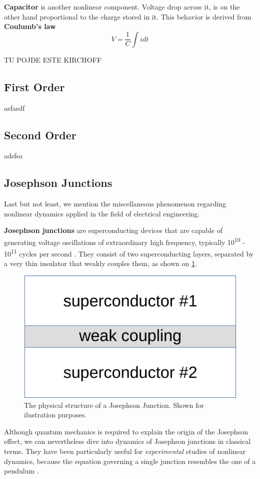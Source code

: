 \documentclass[journal]{IEEEtran}
\begin{document}
\textbf{Capacitor} is another nonlinear component. Voltage drop across it, is on the other hand proportional to the charge stored in it. This behavior is derived from  \textbf{Coulumb's law}
$$V=\frac{1}{C}\int idt$$

TU POJDE ESTE KIRCHOFF

\subsection{First Order}
asfasdf

\subsection{Second Order }
adsfsa


\subsection{Josephson Junctions}
Last but not least, we mention the miscellaneous phenomenon regarding nonlinear dynamics applied in the field of electrical engineering.

\textbf{Josephson junctions} are superconducting devices that are capable of generating voltage oscillations of extraordinary high frequency, typically 10\textsuperscript{10} - 10\textsuperscript{11} cycles per second \cite{van1981principles}. They consist of two superconducting layers, separated by a very thin insulator that weakly couples them, as shown on \cref{f:jjunc}.

\begin{figure}[ht!]
	\centering
	\includegraphics[width=.4\linewidth]{jjunc}
	\caption{The physical structure of a Josephson Junction. Shown for ilustration purposes.}
	\label{f:jjunc}
\end{figure}

Although quantum mechanics is required to explain the origin of the Josephson effect, we can nevertheless dive into dynamics of Josephson junctions in classical terms. They have been particularly useful for \textit{experimental} studies of nonlinear dynamics, because the equation governing a single junction resembles the one of a pendulum \cite{strogatz1994nonlinear}.
\end{document}
